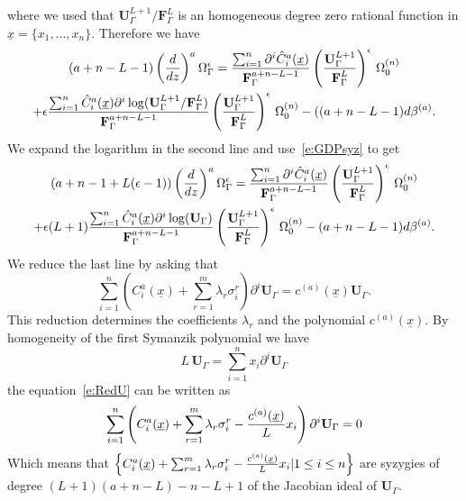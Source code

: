 \documentclass[a4paper,12pt]{article}
\numberwithin{equation}{section}
\numberwithin{figure}{subsection}
\theoremstyle{plain}
\theoremstyle{plain}
\theoremstyle{definition}
\theoremstyle{plain}
\theoremstyle{remark}
\theoremstyle{plain}
\begin{document}
where we used that $\textbf{U}_\Gamma^{L+1}/
   \textbf{F}_\Gamma^L$ is an homogeneous degree zero rational
   function in $\underline x=\{x_1,\dots,x_n\}$.
Therefore we have
\begin{multline}
  (a+n-L-1)   \left(d\over dz\right)^a
 \Omega_\Gamma^\epsilon= {
     \sum_{i=1}^n  \partial ^i \hat C^{a}_i
     (\underline x)
    \over   \textbf{F}_\Gamma^{a+n-L-1}}\left(\textbf{U}_\Gamma^{L+1}\over
    \textbf{F}_\Gamma^L \right)^\epsilon\, \Omega_0^{(n)}\cr
  +\epsilon {
     \sum_{i=1}^n  \hat C^{a}_i
     (\underline x) \partial ^i \log(\textbf{U}_\Gamma^{L+1}/
    \textbf{F}_\Gamma^L )
    \over   \textbf{F}_\Gamma^{a+n-L-1}}\left(\textbf{U}_\Gamma^{L+1}\over
    \textbf{F}_\Gamma^L \right)^\epsilon\, \Omega_0^{(n)}-( (a+n-L-1) d\beta^{(a)}.
\end{multline}
We expand the logarithm in the second line and use~\eqref{e:GDPsyz} to
get
\begin{multline}
 (a+n-1+L(\epsilon-1))   \left(d\over dz\right)^a
 \Omega_\Gamma^\epsilon= {
     \sum_{i=1}^n  \partial ^i \hat C^{a}_i
     (\underline x)
    \over   \textbf{F}_\Gamma^{a+n-L-1}}\left(\textbf{U}_\Gamma^{L+1}\over
    \textbf{F}_\Gamma^L \right)^\epsilon\, \Omega_0^{(n)}\cr
  +\epsilon(L+1) {
     \sum_{i=1}^n  \hat C^{a}_i
     (\underline x) \partial ^i \log(\textbf{U}_\Gamma)
    \over   \textbf{F}_\Gamma^{a+n-L-1}}\left(\textbf{U}_\Gamma^{L+1}\over
    \textbf{F}_\Gamma^L \right)^\epsilon\, \Omega_0^{(n)}- (a+n-L-1)  d\beta^{(a)}.
\end{multline}
We reduce the last line by asking that
\begin{equation}\label{e:RedU}
  \sum_{i=1}^n  \left( C^{a}_i(\underline x)+\sum_{r=1}^m \lambda_r\sigma^r_i
   \right) \partial ^i \textbf{U}_\Gamma  =c^{(a)}(\underline x)  \textbf{U}_\Gamma.
\end{equation}
This reduction determines the coefficients $\lambda_r$  and the
polynomial $c^{(a)}(\underline x)$.  By homogeneity of the first
Symanzik polynomial we have
\begin{equation}
L\,  \textbf{U}_\Gamma = \sum_{i=1}^n x_i \partial^i \textbf{U}_\Gamma
\end{equation}
the equation~\eqref{e:RedU} can be written as
\begin{equation}
     \sum_{i=1}^n  \left( C^{a}_i(\underline x)+\sum_{r=1}^m \lambda_r\sigma^r_i
  -{c^{(a)}(\underline x)\over L} x_i \right) \partial ^i \textbf{U}_\Gamma  =0
\end{equation}
Which means that $ \left\{ C^{a}_i(\underline x)+\sum_{r=1}^m \lambda_r\sigma^r_i
  -{c^{(a)}(\underline x)\over L} x_i\vert 1\leq i\leq n \right\}$  are syzygies of degree
$(L+1)(a+n-L)-n-L+1$ of the Jacobian ideal of $\textbf{U}_\Gamma$.
\end{document}
